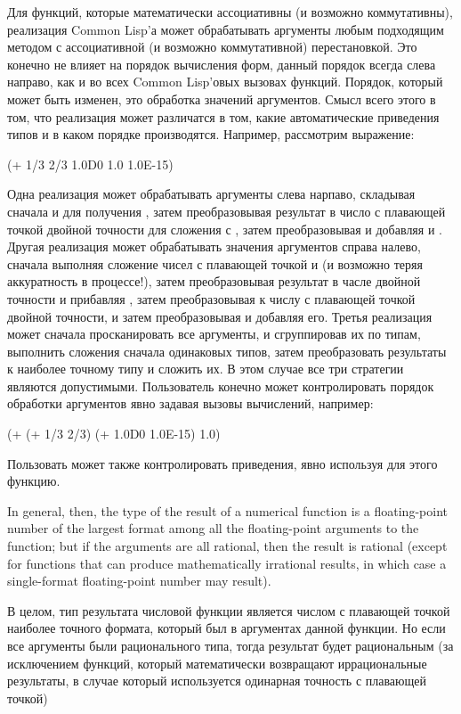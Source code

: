 Для функций, которые математически ассоциативны (и возможно коммутативны),
реализация Common Lisp'а может обрабатывать аргументы любым подходящим методом с
ассоциативной (и возможно коммутативной) перестановкой.
Это конечно не влияет на порядок вычисления форм, данный порядок всегда слева
направо, как и во всех Common Lisp'овых вызовах функций. Порядок, который может
быть изменен, это обработка значений аргументов.
Смысл всего этого в том, что реализация может различатся в том, какие
автоматические приведения типов и в каком порядке производятся. Например,
рассмотрим выражение:
\begin{lisp}
(+ 1/3 2/3 1.0D0 1.0 1.0E-15)
\end{lisp}
Одна реализация может обрабатывать аргументы слева нарпаво, складывая сначала
 и  для получения , затем преобразовывая результат в число
с плавающей точкой двойной точности для сложения с , затем
преобразовывая и добавляя  и . Другая реализация может
обрабатывать значения аргументов справа налево, сначала выполняя сложение чисел
с плавающей точкой  и  (и возможно теряя аккуратность в
процессе!), затем преобразовывая результат в часле двойной точности и прибавляя
, затем преобразовывая  к числу с плавающей точкой двойной
точности, и затем преобразовывая  и добавляя его.
Третья реализация может сначала просканировать все аргументы, и сгруппировав их
по типам, выполнить сложения сначала одинаковых типов, затем преобразовать
результаты к наиболее точному типу и сложить их. В этом случае все три стратегии
являются допустимыми. Пользователь конечно может контролировать порядок
обработки аргументов явно задавая вызовы вычислений, например:
\begin{lisp}
(+ (+ 1/3 2/3) (+ 1.0D0 1.0E-15) 1.0)
\end{lisp}
Пользовать может также контролировать приведения, явно используя  для этого
функцию.

In general, then, the type of the result of a numerical function
is a floating-point number of the largest format among all the
floating-point arguments to the function; but if the arguments
are all rational, then the result is rational (except for functions
that can produce mathematically irrational results, in which case
a single-format floating-point number may result).

В целом, тип результата числовой функции является числом с плавающей точкой
наиболее точного формата, который был в аргументах данной функции.
Но если все аргументы были рационального типа, тогда результат будет
рациональным (за исключением функций, который математически возвращают
иррациональные результаты, в случае который используется одинарная точность с
плавающей точкой) 

